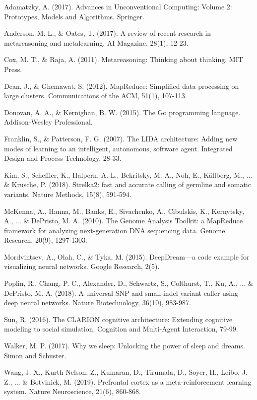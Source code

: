 \documentclass[11pt,a4paper,twocolumn]{article}
\begin{document}

\begin{thebibliography}{10}

Adamatzky, A. (2017).
\newblock Advances in Unconventional Computing: Volume 2: Prototypes, Models and Algorithms.
\newblock Springer.

Anderson, M. L., \& Oates, T. (2017).
\newblock A review of recent research in metareasoning and metalearning.
\newblock AI Magazine, 28(1), 12-23.

Cox, M. T., \& Raja, A. (2011).
\newblock Metareasoning: Thinking about thinking.
\newblock MIT Press.

Dean, J., \& Ghemawat, S. (2012).
\newblock MapReduce: Simplified data processing on large clusters.
\newblock Communications of the ACM, 51(1), 107-113.

Donovan, A. A., \& Kernighan, B. W. (2015).
\newblock The Go programming language.
\newblock Addison-Wesley Professional.

Franklin, S., \& Patterson, F. G. (2007).
\newblock The LIDA architecture: Adding new modes of learning to an intelligent, autonomous, software agent.
\newblock Integrated Design and Process Technology, 28-33.

Kim, S., Scheffler, K., Halpern, A. L., Bekritsky, M. A., Noh, E., Källberg, M., ... \& Krusche, P. (2018).
\newblock Strelka2: fast and accurate calling of germline and somatic variants.
\newblock Nature Methods, 15(8), 591-594.

McKenna, A., Hanna, M., Banks, E., Sivachenko, A., Cibulskis, K., Kernytsky, A., ... \& DePristo, M. A. (2010).
\newblock The Genome Analysis Toolkit: a MapReduce framework for analyzing next-generation DNA sequencing data.
\newblock Genome Research, 20(9), 1297-1303.

Mordvintsev, A., Olah, C., \& Tyka, M. (2015).
\newblock DeepDream—a code example for visualizing neural networks.
\newblock Google Research, 2(5).

Poplin, R., Chang, P. C., Alexander, D., Schwartz, S., Colthurst, T., Ku, A., ... \& DePristo, M. A. (2018).
\newblock A universal SNP and small-indel variant caller using deep neural networks.
\newblock Nature Biotechnology, 36(10), 983-987.

Sun, R. (2016).
\newblock The CLARION cognitive architecture: Extending cognitive modeling to social simulation.
\newblock Cognition and Multi-Agent Interaction, 79-99.

Walker, M. P. (2017).
\newblock Why we sleep: Unlocking the power of sleep and dreams.
\newblock Simon and Schuster.

Wang, J. X., Kurth-Nelson, Z., Kumaran, D., Tirumala, D., Soyer, H., Leibo, J. Z., ... \& Botvinick, M. (2019).
\newblock Prefrontal cortex as a meta-reinforcement learning system.
\newblock Nature Neuroscience, 21(6), 860-868.

\end{thebibliography}
\end{document}
